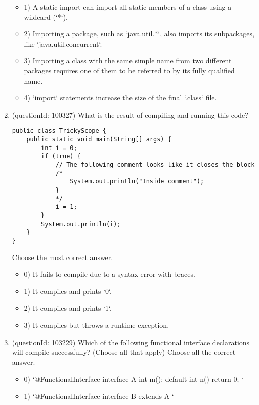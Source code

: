 \documentclass[12pt]{article}
\begin{document}
\begin{enumerate}[label=(\arabic*)]
\begin{itemize}
\item 1) A static import can import all static members of a class using a wildcard (`*`).

\item 2) Importing a package, such as `java.util.*`, also imports its subpackages, like `java.util.concurrent`.

\item 3) Importing a class with the same simple name from two different packages requires one of them to be referred to by its fully qualified name.

\item 4) `import` statements increase the size of the final `.class` file.

\end{itemize}
\item (questionId: 100327) What is the result of compiling and running this code?
\begin{verbatim}
public class TrickyScope {
    public static void main(String[] args) {
        int i = 0;
        if (true) {
            // The following comment looks like it closes the block
            /*
                System.out.println("Inside comment");
            }
            */
            i = 1;
        } 
        System.out.println(i);
    }
}
\end{verbatim}
Choose the most correct answer. 
\begin{itemize}
\item 0) It fails to compile due to a syntax error with braces.

\item 1) It compiles and prints `0`.

\item 2) It compiles and prints `1`.

\item 3) It compiles but throws a runtime exception.

\end{itemize}
\item (questionId: 103229) Which of the following functional interface declarations will compile successfully? (Choose all that apply)
Choose all the correct answer.\begin{itemize}
\item 0) `@FunctionalInterface interface A { int m(); default int n() {return 0;} }`

\item 1) `@FunctionalInterface interface B extends A { }`


\end{itemize}
\end{enumerate}
\end{document}
